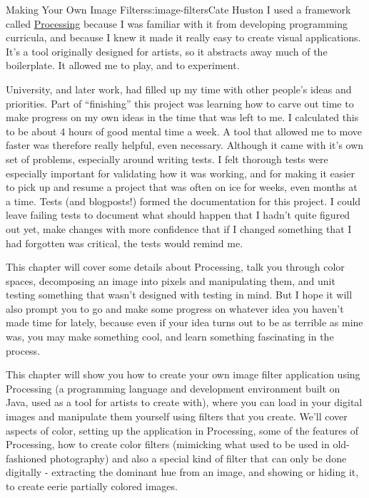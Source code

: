 \begin{aosachapter}{Making Your Own Image Filters}{s:image-filters}{Cate Huston}
I used a framework called \href{https://processing.org/}{Processing}
because I was familiar with it from developing programming curricula,
and because I knew it made it really easy to create visual applications.
It's a tool originally designed for artists, so it abstracts away much
of the boilerplate. It allowed me to play, and to experiment.

University, and later work, had filled up my time with other people's
ideas and priorities. Part of ``finishing'' this project was learning
how to carve out time to make progress on my own ideas in the time that
was left to me. I calculated this to be about 4 hours of good mental
time a week. A tool that allowed me to move faster was therefore really
helpful, even necessary. Although it came with it's own set of problems,
especially around writing tests. I felt thorough tests were especially
important for validating how it was working, and for making it easier to
pick up and resume a project that was often on ice for weeks, even
months at a time. Tests (and blogposts!) formed the documentation for
this project. I could leave failing tests to document what should happen
that I hadn't quite figured out yet, make changes with more confidence
that if I changed something that I had forgotten was critical, the tests
would remind me.

This chapter will cover some details about Processing, talk you through
color spaces, decomposing an image into pixels and manipulating them,
and unit testing something that wasn't designed with testing in mind.
But I hope it will also prompt you to go and make some progress on
whatever idea you haven't made time for lately, because even if your
idea turns out to be as terrible as mine was, you may make something
cool, and learn something fascinating in the process.

\label{the-app}

This chapter will show you how to create your own image filter
application using Processing (a programming language and development
environment built on Java, used as a tool for artists to create with),
where you can load in your digital images and manipulate them yourself
using filters that you create. We'll cover aspects of color, setting up
the application in Processing, some of the features of Processing, how
to create color filters (mimicking what used to be used in old-fashioned
photography) and also a special kind of filter that can only be done
digitally - extracting the dominant hue from an image, and showing or
hiding it, to create eerie partially colored images.


\end{aosachapter}
